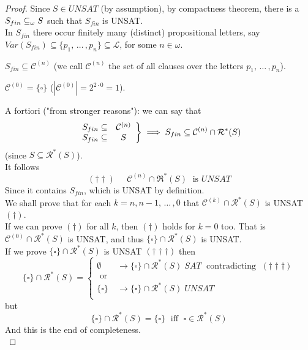 \begin{proof}
	Since $S \in UNSAT$ (by assumption), by compactness theorem, there is a $S_{fin} \subseteq_\omega S$ such that $S_{fin}$ is UNSAT.\\
	
	In $S_{fin}$ there occur finitely many (distinct) propositional letters, say $Var (S_{fin}) \subseteq \{p_1, \, \dots \, , p_n\} \subseteq \mathcal{L}$, for some $n \in \omega$.\\
	
	\begin{remark}
		$S_{fin} \subseteq \mathcal{C}^{(n)}$ (we call $\mathcal{C}^{(n)}$ the set of all clauses over the letters $p_1, \, \dots \, , p_n$).\\
	\end{remark}
	
	\begin{remark}
		$\mathcal{C}^{(0)} = \{\square\}$ ($|\mathcal{C}^{(0)}| = 2^{2 \cdot 0} = 1$).\\
	\end{remark}
	
	A fortiori ("from stronger reasons"): we can say that 
	$$ 
	\left.
	\begin{array}{c c}
		S_{fin} \subseteq &\mathcal{C}^{(n)} \\
		S_{fin} \subseteq & S
	\end{array}
	\right\} \implies S_{fin} \subseteq \mathcal{C}^{(n)} \cap \mathcal{R}^\ast (S)
	$$
	(since $S \subseteq \mathcal{R}^\ast (S)$).\\
	
	It follows 
	$$ (\dag \dag) \;\;\;\;\; \mathcal{C}^{(n)} \cap \mathfrak{R}^\ast (S) \; \text{ is } UNSAT $$
	Since it contains $S_{fin}$, which is UNSAT by definition.\\
	
	We shall prove that for each $k = n, n-1, \, \dots \, , 0$ that $\mathcal{C}^{(k)} \cap \mathcal{R}^\ast (S)$ is UNSAT $(\dag)$.\\
	
	If we can prove $(\dag)$ for all $k$, then $(\dag)$ holds for $k = 0$ too. That is $\mathcal{C}^{(0)} \cap \mathcal{R}^\ast (S)$ is UNSAT, and thus $\{\square\} \cap \mathcal{R}^\ast (S)$ is UNSAT.\\
	
	If we prove $\{\square\} \cap \mathcal{R}^\ast (S)$ is UNSAT $(\dag\dag\dag)$ then 
	$$ \{\square\} \cap \mathcal{R}^\ast (S) = \begin{cases}
		\emptyset & \rightarrow \{\square\} \cap \mathcal{R}^\ast (S) \; SAT \; \text{ contradicting } \; (\dag\dag\dag) \\
		\text{ or } & \\
		\{\square\} & \rightarrow \{\square\} \cap \mathcal{R}^\ast (S) \; UNSAT \\
	\end{cases}
	$$
	but 
	$$ \{\square\} \cap \mathcal{R}^\ast (S) = \{\square\} \; \text{ iff } \; \square \in \mathcal{R}^\ast (S)$$
	And this is the end of completeness.\\
\end{proof}

